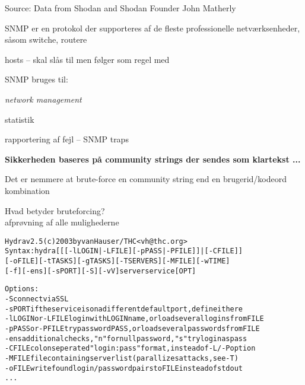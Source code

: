 \documentclass[Screen16to9,17pt]{foils}
\begin{document}
Source: Data from Shodan and Shodan Founder John Matherly


\begin{list1}
\item SNMP er en protokol der supporteres af de fleste professionelle
  netværksenheder, såsom switche, routere
\item hosts -- skal slås til men følger som regel med
\item SNMP bruges til:
  \begin{list2}
    \item \emph{network management}
    \item statistik
    \item rapportering af fejl -- SNMP traps
  \end{list2}
\item {\bfseries Sikkerheden baseres på community strings der sendes
    som klartekst ...}
\item Det er nemmere at brute-force en community string end en
  brugerid/kodeord kombination
\end{list1}


\begin{list1}
\item Hvad betyder bruteforcing?\\
afprøvning af alle mulighederne
\end{list1}

\begin{alltt}\small
Hydra v2.5 (c) 2003 by van Hauser / THC <vh@thc.org>
Syntax: hydra [[[-l LOGIN|-L FILE] [-p PASS|-P FILE]] | [-C FILE]]
[-o FILE] [-t TASKS] [-g TASKS] [-T SERVERS] [-M FILE] [-w TIME]
[-f] [-e ns] [-s PORT] [-S] [-vV] server service [OPT]

Options:
  -S        connect via SSL
  -s PORT   if the service is on a different default port, define it here
  -l LOGIN  or -L FILE login with LOGIN name, or load several logins from FILE
  -p PASS   or -P FILE try password PASS, or load several passwords from FILE
  -e ns     additional checks, "n" for null password, "s" try login as pass
  -C FILE   colon seperated "login:pass" format, instead of -L/-P option
  -M FILE   file containing server list (parallizes attacks, see -T)
  -o FILE   write found login/password pairs to FILE instead of stdout
...
\end{alltt}
\end{document}
